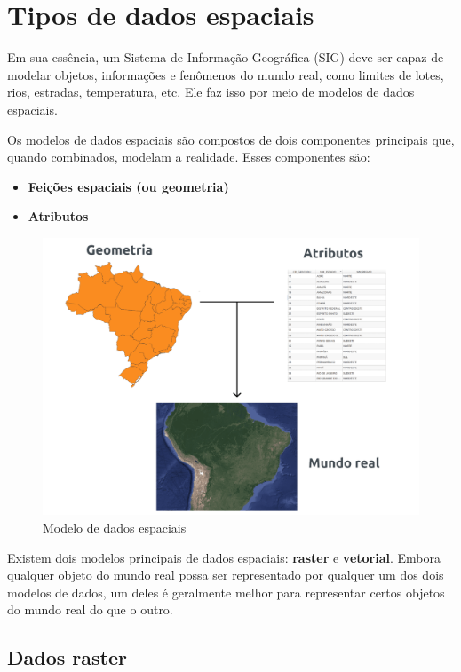 \documentclass[
]{krantz}
\providecommand{\tightlist}{%
  \setlength{\itemsep}{0pt}\setlength{\parskip}{0pt}}
\begin{document}
\hypertarget{tipos-de-dados-espaciais}{%
\section{Tipos de dados espaciais}\label{tipos-de-dados-espaciais}}

Em sua essência, um Sistema de Informação Geográfica (SIG) deve ser capaz de modelar objetos, informações e fenômenos do mundo real, como limites de lotes, rios, estradas, temperatura, etc. Ele faz isso por meio de modelos de dados espaciais.

Os modelos de dados espaciais são compostos de dois componentes principais que, quando combinados, modelam a realidade. Esses componentes são:

\begin{itemize}
\tightlist
\item
  \textbf{Feições espaciais (ou geometria)}
\item
  \textbf{Atributos}
\end{itemize}

\begin{figure}
\centering
\includegraphics{media/modulo0/spatial-model.png}
\caption{Modelo de dados espaciais}
\end{figure}

Existem dois modelos principais de dados espaciais: \textbf{raster} e \textbf{vetorial}. Embora qualquer objeto do mundo real possa ser representado por qualquer um dos dois modelos de dados, um deles é geralmente melhor para representar certos objetos do mundo real do que o outro.

\hypertarget{dados-raster}{%
\subsection{Dados raster}\label{dados-raster}}
\end{document}
